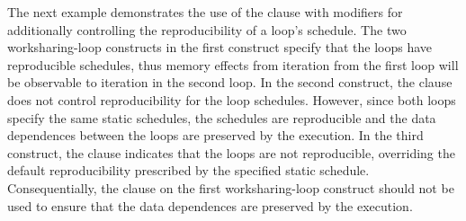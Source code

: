 The next example demonstrates the use of the  clause 
with modifiers for additionally controlling the reproducibility of a loop's 
schedule.
The two worksharing-loop constructs in the first  construct
specify that the loops have reproducible schedules, thus memory effects from iteration  from the first loop will be observable to iteration 
in the second loop. 
In the second  construct, the  clause does not 
control reproducibility for the loop schedules. However, since both loops 
specify the same static schedules, the schedules are reproducible and the 
data dependences between the loops are preserved by the execution.
In the third  construct, the  clause indicates 
that the loops are not reproducible, overriding the default reproducibility
prescribed by the specified static schedule. Consequentially, 
the  clause on the first worksharing-loop construct should not 
be used to ensure that the data dependences are preserved by the execution.



